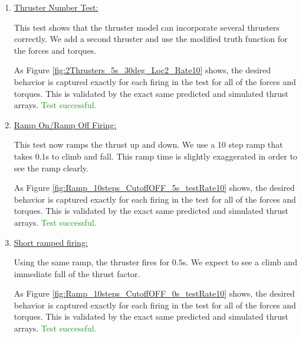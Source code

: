 \documentclass[]{BasiliskReportMemo}
\begin{document}
\begin{enumerate}
   \item{\underline{Thruster Number Test:} }
   
         

 This test shows that the thruster model can incorporate several thrusters correctly. We add a second thruster and use the modified truth function for the forces and torques.
      
    
    
    As Figure \ref{fig:2Thrusters_5s_30deg_Loc2_Rate10} shows, the desired behavior is captured exactly for each 
    firing in the test for all of the forces and torques. This is validated by the exact same predicted and simulated thrust arrays.  \textcolor{ForestGreen}{Test successful.}
   
\item{\underline{Ramp On/Ramp Off Firing:} }

         

 This test now ramps the thrust up and down. We use a 10 step ramp that takes $0.1$s to climb and fall. This ramp time is slightly exaggerated in order to see the ramp clearly.      
    
    
    As Figure \ref{fig:Ramp_10steps_CutoffOFF_5s_testRate10} shows, the desired behavior is captured exactly for each 
    firing in the test for all of the forces and torques. This is validated by the exact same predicted and simulated thrust arrays. \textcolor{ForestGreen}{Test successful.}
   

  \item{\underline{Short ramped firing:} }
  
    

Using the same ramp, the thruster fires for $0.5$s. We expect to see a climb and immediate fall of the thrust factor.
       
    
    
    As Figure \ref{fig:Ramp_10steps_CutoffOFF_0s_testRate10} shows, the desired behavior is captured exactly for each 
    firing in the test for all of the forces and torques. This is validated by the exact same predicted and simulated thrust arrays. \textcolor{ForestGreen}{Test successful.}
  

\end{enumerate}
\end{document}
